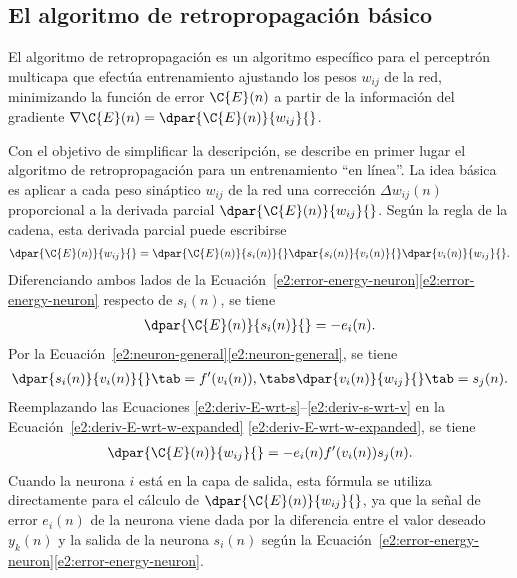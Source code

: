 %
%
\subsection{El algoritmo de retropropagación básico}
%
El algoritmo de retropropagación es un algoritmo específico para el
perceptrón multicapa que efectúa entrenamiento ajustando los pesos
$w_{ij}$ de la red, minimizando la función de error
$\C{E}(n)$ a partir de la información del gradiente
$\nabla\C{E}(n)=\dpar{\C{E}(n)}{w_{ij}}{}$.

Con el objetivo de simplificar la descripción, se describe en primer
lugar el algoritmo de retropropagación para un entrenamiento ``en
línea''.
La idea básica es aplicar a cada peso sináptico $w_{ij}$ de la red una
corrección $\Delta{}w_{ij}(n)$ proporcional a la derivada parcial
$\dpar{\C{E}(n)}{w_{ij}}{}$.
Según la regla de la cadena, esta derivada parcial puede escribirse
%
\begin{align}\label{e2:deriv-E-wrt-w-expanded}
  \dpar{\C{E}(n)}{w_{ij}}{} = \dpar{\C{E}(n)}{s_i(n)}{}
  \dpar{s_i(n)}{v_i(n)}{} \dpar{v_i(n)}{w_{ij}}{}.
\end{align}
%
Diferenciando ambos lados de la
\iflatexml{}Ecuación~\ref{e2:error-energy-neuron}\else\autoref{e2:error-energy-neuron}\fi{}
respecto de $s_i(n)$, se tiene
%
\begin{align}\label{e2:deriv-E-wrt-s}
  \dpar{\C{E}(n)}{s_i(n)}{} = -e_i(n).
\end{align}
%
Por la \iflatexml{}Ecuación~\ref{e2:neuron-general}\else\autoref{e2:neuron-general}\fi, se tiene
%
\begin{align}\label{e2:deriv-s-wrt-v}
  \dpar{s_i(n)}{v_i(n)}{} \tab = f'(v_i(n)),\tabs
  \dpar{v_i(n)}{w_{ij}}{} \tab = s_j(n).
\end{align}
%
Reemplazando las Ecuaciones
\ref{e2:deriv-E-wrt-s}--\ref{e2:deriv-s-wrt-v} en la
\iflatexml{}Ecuación~\ref{e2:deriv-E-wrt-w-expanded}
\else\autoref{e2:deriv-E-wrt-w-expanded}\fi, se tiene
%
\begin{align}\label{e2:deriv-E-wrt-w}
  \dpar{\C{E}(n)}{w_{ij}}{} = -e_i(n) f'(v_i(n)) s_j(n).
\end{align}
%
Cuando la neurona $i$ está en la capa de salida, esta fórmula se
utiliza directamente para el cálculo de $\dpar{\C{E}(n)}{w_{ij}}{}$,
ya que la señal de error $e_i(n)$ de la neurona viene dada por la
diferencia entre el valor deseado $y_k(n)$ y la salida de la neurona
$s_i(n)$ según la
\iflatexml{}Ecuación~\ref{e2:error-energy-neuron}\else\autoref{e2:error-energy-neuron}\fi.

